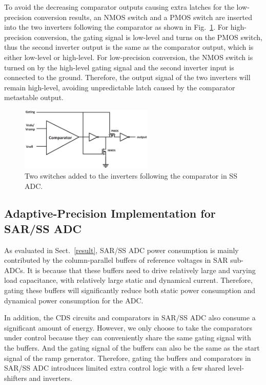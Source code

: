 To avoid the decreasing comparator outputs causing extra latches for the low-precision conversion results, an NMOS switch and a PMOS switch are inserted into the two inverters following the comparator as shown in Fig.~\ref{MATE}. 
For high-precision conversion, the gating signal is low-level and turns on the PMOS switch, thus the second inverter output is the same as the comparator output, which is either low-level or high-level. 
For low-precision conversion, the NMOS switch is turned on by the high-level gating signal and the second inverter input is connected to the ground. Therefore, the output signal of the two inverters will remain high-level, avoiding unpredictable latch caused by the comparator metastable output.

\begin{figure}[htbp]
	\centerline{\includegraphics[width=2.5in]{./Figures/MATE.eps}}
	\caption{Two switches added to the inverters following the comparator in SS ADC.}
	\label{MATE}
\end{figure} 

\subsection{Adaptive-Precision Implementation for SAR/SS ADC}\label{gating3}

As evaluated in Sect.~\ref{result}, SAR/SS ADC power consumption is mainly contributed by the column-parallel buffers of reference voltages in SAR sub-ADCs.
It is because that these buffers need to drive relatively large and varying load capacitance, with relatively large static and dynamical current.
Therefore, gating these buffers will significantly reduce both static power consumption and dynamical power consumption for the ADC.

In addition, the CDS circuits and comparators in SAR/SS ADC also consume a significant amount of energy. However, we only choose to take the comparators under control because they can conveniently share the same gating signal with the buffers. And the gating signal of the buffers can also be the same as the start signal of the ramp generator. Therefore, gating the buffers and comparators in SAR/SS ADC introduces limited extra control logic with a few shared level-shifters and inverters.

